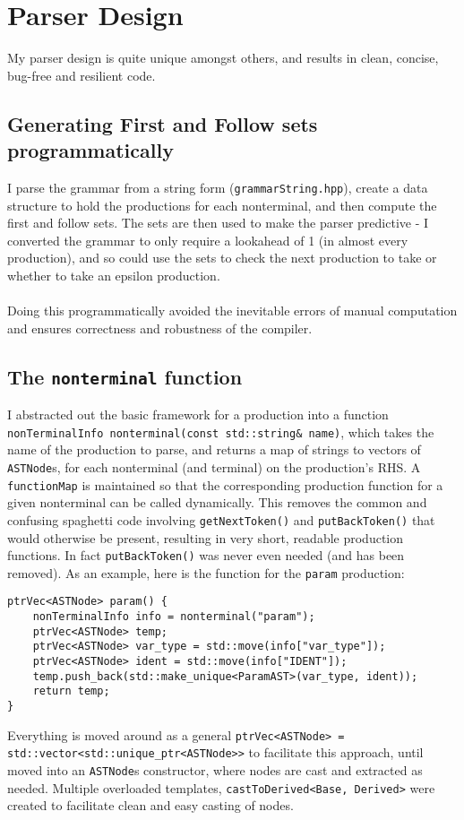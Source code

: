 \documentclass[10pt,a4paper]{article}
\newcommand{\code}[1]{\lstinline!#1!}
\begin{document}
\section*{Parser Design}
My parser design is quite unique amongst others, and results in clean, concise, bug-free and resilient code. 
\subsection*{Generating First and Follow sets programmatically}
I parse the grammar from a string form (\code{grammarString.hpp}), create a data structure to hold the productions for each nonterminal, and then compute the first and follow sets. The sets are then used to make the parser predictive - I converted the grammar to only require a lookahead of 1 (in almost every production), and so could use the sets to check the next production to take or whether to take an epsilon production.\\\\
Doing this programmatically avoided the inevitable errors of manual computation and ensures correctness and robustness of the compiler.
\subsection*{The \code{nonterminal} function}
I abstracted out the basic framework for a production into a function \code{nonTerminalInfo nonterminal(const std::string& name)}, which takes the name of the production to parse, and returns a map of strings to vectors of \code{ASTNode}s, for each nonterminal (and terminal) on the production's RHS. A \code{functionMap} is maintained so that the corresponding production function for a given nonterminal can be called dynamically. This removes the common and confusing spaghetti code involving \code{getNextToken()} and \code{putBackToken()} that would otherwise be present, resulting in very short, readable production functions. In fact \code{putBackToken()} was never even needed (and has been removed). As an example, here is the function for the \code{param} production:
\begin{lstlisting}[]
ptrVec<ASTNode> param() {
    nonTerminalInfo info = nonterminal("param");
    ptrVec<ASTNode> temp;
    ptrVec<ASTNode> var_type = std::move(info["var_type"]);
    ptrVec<ASTNode> ident = std::move(info["IDENT"]);
    temp.push_back(std::make_unique<ParamAST>(var_type, ident));
    return temp;
}
\end{lstlisting}
Everything is moved around as a general \code{ptrVec<ASTNode> = std::vector<std::unique_ptr<ASTNode>>} to facilitate this approach, until moved into an \code{ASTNode}s constructor, where nodes are cast and extracted as needed. Multiple overloaded templates, \code{castToDerived<Base, Derived>} were created to facilitate clean and easy casting of nodes.
\end{document}
